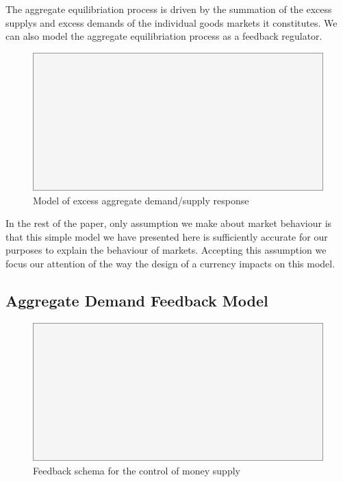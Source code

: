 The aggregate equilibriation process is driven by the summation of the excess supplys and excess
demands of the individual goods markets it constitutes. We can also model the aggregate
equilibriation process as a feedback regulator.

\begin{figure}[H]
\centering
\includegraphics[scale=0.48]{blank}
\caption{Model of excess aggregate demand/supply response}
\label{fig:macro_feedback}
\end{figure}

In the rest of the paper, only assumption we make about market behaviour is that this simple model
we have presented here is sufficiently accurate for our purposes to explain the behaviour of
markets. Accepting this assumption we focus our attention of the way the design of a currency
impacts on this model.

\subsection{Aggregate Demand Feedback Model}

\begin{figure}[H]
\centering
\includegraphics[scale=0.48]{blank}
\caption{Feedback schema for the control of money supply}
\label{fig:money_supply_feedback}
\end{figure}

